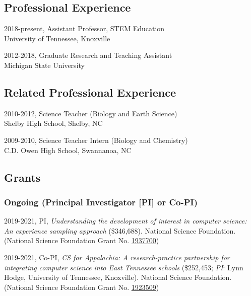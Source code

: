 \documentclass[14,]{article}
\begin{document}
\hypertarget{professional-experience}{%
\subsection{Professional Experience}\label{professional-experience}}

2018-present, Assistant Professor, STEM Education\\
University of Tennessee, Knoxville

2012-2018, Graduate Research and Teaching Assistant\\
Michigan State University

\hypertarget{related-professional-experience}{%
\subsection{Related Professional
Experience}\label{related-professional-experience}}

2010-2012, Science Teacher (Biology and Earth Science)\\
Shelby High School, Shelby, NC

2009-2010, Science Teacher Intern (Biology and Chemistry)\\
C.D. Owen High School, Swannanoa, NC

\hypertarget{grants}{%
\subsection{Grants}\label{grants}}

\hypertarget{ongoing-principal-investigator-pi-or-co-pi}{%
\subsubsection{Ongoing (Principal Investigator {[}PI{]} or
Co-PI)}\label{ongoing-principal-investigator-pi-or-co-pi}}

2019-2021, PI, \emph{Understanding the development of interest in
computer science: An experience sampling approach} (\$346,688). National
Science Foundation. (National Science Foundation Grant No.
\href{https://www.nsf.gov/awardsearch/showAward?AWD_ID=1937700\&HistoricalAwards=false}{1937700})

2019-2021, Co-PI, \emph{CS for Appalachia: A research-practice
partnership for integrating computer science into East Tennessee
schools} (\$252,453; \emph{PI}: Lynn Hodge, University of Tennessee,
Knoxville). National Science Foundation. (National Science Foundation
Grant No.
\href{https://www.nsf.gov/awardsearch/showAward?AWD_ID=1923509\&HistoricalAwards=false}{1923509})
\end{document}
